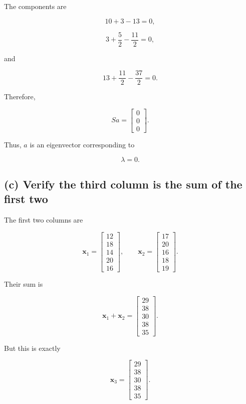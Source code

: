 \documentclass{article}
\begin{document}
The components are

\[
10+3-13=0,
\]

\[
3+\frac52-\frac{11}{2}=0,
\]

and

\[
13+\frac{11}{2}-\frac{37}{2}=0.
\]

Therefore,

\[
\boxed{
Sa=
\begin{bmatrix}
0\\0\\0
\end{bmatrix}}.
\]

Thus, \(a\) is an eigenvector corresponding to

\[
\boxed{\lambda=0}.
\]

\subsection*{(c) Verify the third column is the sum of the first two}

The first two columns are

\[
\mathbf x_1=
\begin{bmatrix}
12\\18\\14\\20\\16
\end{bmatrix},
\qquad
\mathbf x_2=
\begin{bmatrix}
17\\20\\16\\18\\19
\end{bmatrix}.
\]

Their sum is

\[
\mathbf x_1+\mathbf x_2
=
\begin{bmatrix}
29\\38\\30\\38\\35
\end{bmatrix}.
\]

But this is exactly

\[
\mathbf x_3=
\begin{bmatrix}
29\\38\\30\\38\\35
\end{bmatrix}.
\]
\end{document}
